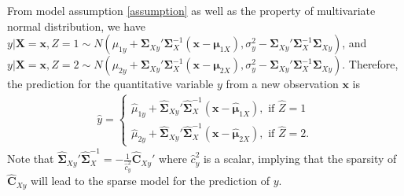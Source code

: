 \documentclass[12pt]{article}
\begin{document}
From model assumption \eqref{assumption} as well as the property of multivariate normal distribution, we have
$y | \bm X = \bm x, Z = 1 \sim N \left( \mu_{1y} + \bm \Sigma_{Xy}' \bm \Sigma_{X}^{-1} (\bm x - \bm \mu_{1X}), \sigma_{y}^2 - \bm \Sigma_{Xy}' \bm \Sigma_{X}^{-1} \bm \Sigma_{Xy} \right)$, and
$y | \bm X = \bm x, Z = 2 \sim N \left( \mu_{2y} + \bm \Sigma_{Xy}' \bm \Sigma_{X}^{-1} (\bm x - \bm \mu_{2X}), \sigma_{y}^2 - \bm \Sigma_{Xy}' \bm \Sigma_{X}^{-1} \bm \Sigma_{Xy} \right)$.
Therefore, the prediction for the quantitative variable $y$ from a new observation $\bm x$ is
\begin{align}\label{ypred}
\hat{y} = \left\{
\begin{array}{cccc}
\hat{\mu}_{1y} + \hat{\bm \Sigma}_{Xy}' \hat{\bm \Sigma}_{X}^{-1} (\bm x - \hat{\bm \mu}_{1X}), \mbox{ if }  \hat{Z} = 1 \\
\hat{\mu}_{2y} + \hat{\bm \Sigma}_{Xy}' \hat{\bm \Sigma}_{X}^{-1} (\bm x - \hat{\bm \mu}_{2X}), \mbox{ if }  \hat{Z} = 2.
\end{array}
\right.
\end{align}
Note that $\hat{\bm \Sigma}_{Xy}' \hat{\bm \Sigma}_{X}^{-1} = -\frac{1}{\hat{c}_{y}^2} \hat{\bm C}_{Xy}'$ where $\hat{c}_{y}^2$ is a scalar, implying that the sparsity of $\hat{\bm C}_{Xy}$ will lead to the sparse model for the prediction of $y$.
\end{document}
